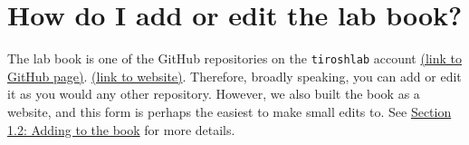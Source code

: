 \documentclass[
]{book}
\begin{document}
\hypertarget{how-do-i-add-or-edit-the-lab-book}{%
\section{How do I add or edit the lab book?}\label{how-do-i-add-or-edit-the-lab-book}}

The lab book is one of the GitHub repositories on the \texttt{tiroshlab} account \href{https://github.com/tiroshlab/lab-book}{(link to GitHub page)}. \href{https://tiroshlab.github.io/lab-book/}{(link to website)}. Therefore, broadly speaking, you can add or edit it as you would any other repository. However, we also built the book as a website, and this form is perhaps the easiest to make small edits to. See \href{https://tiroshlab.github.io/lab-book/index.html\#adding-to-the-book}{Section 1.2: Adding to the book} for more details.

  
\end{document}
